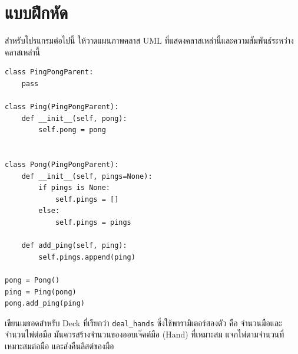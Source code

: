 \section{แบบฝึกหัด}


\begin{exercise}

สำหรับโปรแกรมต่อไปนี้ ให้วาดแผนภาพคลาส UML ที่แสดงคลาสเหล่านี้และความสัมพันธ์ระหว่างคลาสเหล่านี้

\begin{verbatim}
class PingPongParent:
    pass

class Ping(PingPongParent):
    def __init__(self, pong):
        self.pong = pong


class Pong(PingPongParent):
    def __init__(self, pings=None):
        if pings is None:
            self.pings = []
        else:
            self.pings = pings

    def add_ping(self, ping):
        self.pings.append(ping)

pong = Pong()
ping = Ping(pong)
pong.add_ping(ping)
\end{verbatim}


\end{exercise}



\begin{exercise}

เขียนเมธอดสำหรับ Deck ที่เรียกว่า \verb"deal_hands" ซึ่งใช้พารามิเตอร์สองตัว คือ 
จำนวนมือและจำนวนไพ่ต่อมือ มันควรสร้างจำนวนของออบเจ๊คต์มือ (Hand) ที่เหมาะสม แจกไพ่ตามจำนวนที่เหมาะสมต่อมือ และส่งคืนลิสต์ของมือ

\end{exercise}


